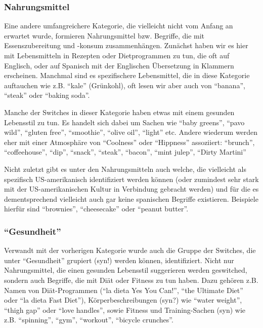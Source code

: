 \subsubsection{Nahrungsmittel}
Eine andere umfangreichere Kategorie, die vielleicht nicht vom Anfang an erwartet wurde, formieren Nahrungsmittel bzw. Begriffe, die mit Essenszubereitung und -konsum zusammenhängen.
Zunächst haben wir es hier mit Lebensmitteln in Rezepten oder Dietprogrammen zu tun, die oft auf Englisch, oder auf Spanisch mit der Englischen Übersetzung in Klammern erscheinen.
Manchmal sind es spezifischere Lebensmittel, die in diese Kategorie auftauchen wie z.B. ``kale'' (Grünkohl), oft lesen wir aber auch von ``banana'', ``steak'' oder ``baking soda''.

Manche der Switches in dieser Kategorie haben etwas mit einem gesunden Lebensstil zu tun.
Es handelt sich dabei um Sachen wie ``baby greens'', ``pavo wild'', ``gluten free'', ``smoothie'', ``olive oil'', ``light'' etc.
Andere wiederum werden eher mit einer Atmosphäre von ``Coolness'' oder ``Hippness'' assoziiert:
``brunch'', ``coffeehouse'', ``dip'', ``snack'', ``steak'', ``bacon'', ``mint julep'', ``Dirty Martini''

Nicht zuletzt gibt es unter den Nahrungsmitteln auch welche, die vielleicht als spezifisch US-amerikanisch identifiziert werden können (oder zumindest sehr stark mit der US-amerikanischen Kultur in Verbindung gebracht werden) und für die es dementsprechend vielleicht auch gar keine spanischen Begriffe existieren.
Beispiele hierfür sind ``brownies'', ``cheesecake'' oder ``peanut butter''.

\subsubsection{``Gesundheit''}
Verwandt mit der vorherigen Kategorie wurde auch die Gruppe der Switches, die unter ``Gesundheit'' grupiert (syn!) werden können, identifiziert.
Nicht nur Nahrungsmittel, die einen gesunden Lebensstil suggerieren werden geswitched, sondern auch Begriffe, die mit Diät oder Fitness zu tun haben.
Dazu gehören z.B. Namen von Diät-Programmen (``la dieta Yes You Can!'', ``the Ultimate Diet'' oder ``la dieta Fast Diet''),
Körperbeschreibungen (syn?) wie ``water weight'', ``thigh gap'' oder ``love handles'',
sowie Fitness und Training-Sachen (syn) wie z.B. ``spinning'', ``gym'', ``workout'', ``bicycle crunches''.

